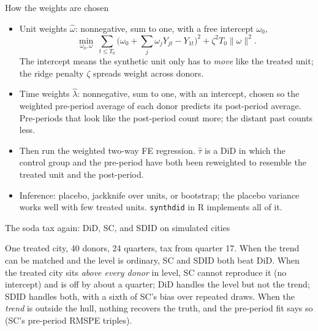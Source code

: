 \documentclass[aspectratio=169,11pt]{beamer}
\begin{document}
\begin{frame}{How the weights are chosen}
\begin{itemize}
	\item \alert{Unit weights} $\hat\omega$: nonnegative, sum to one, with a free intercept $\omega_0$,
	\[
		\min_{\omega_0, \omega}\ \sum_{t \le T_0}\Big(\omega_0 + \sum_{j} \omega_j Y_{jt} - Y_{1t}\Big)^2 + \zeta^2 T_0 \|\omega\|^2 .
	\]
	The intercept means the synthetic unit only has to \emph{move} like the treated unit; the ridge penalty
	$\zeta$ spreads weight across donors.
	\item \alert{Time weights} $\hat\lambda$: nonnegative, sum to one, with an intercept, chosen so the weighted
	pre-period average of each donor predicts its post-period average. Pre-periods that look like the
	post-period count more; the distant past counts less.
	\medskip
	\item Then run the weighted two-way FE regression. $\hat\tau$ is a DiD in which the control group and the
	pre-period have both been reweighted to resemble the treated unit and the post-period.
	\item Inference: placebo, jackknife over units, or bootstrap; the placebo variance works well with few
	treated units. \texttt{synthdid} in R implements all of it.
\end{itemize}
\end{frame}


\begin{frame}{The soda tax again: DiD, SC, and SDID on simulated cities}
\begin{center}
\small
\resizebox{\textwidth}{!}{}
\end{center}
\medskip
\small One treated city, 40 donors, 24 quarters, tax from quarter 17. When the trend can be matched and the
level is ordinary, SC and SDID both beat DiD. When the treated city sits \emph{above every donor} in level,
SC cannot reproduce it (no intercept) and is off by about a quarter; DiD handles the level but not the trend;
SDID handles both, with a sixth of SC's bias over repeated draws. When the \emph{trend} is outside the hull,
nothing recovers the truth, and the pre-period fit says so (SC's pre-period RMSPE triples).
\end{frame}
\end{document}
